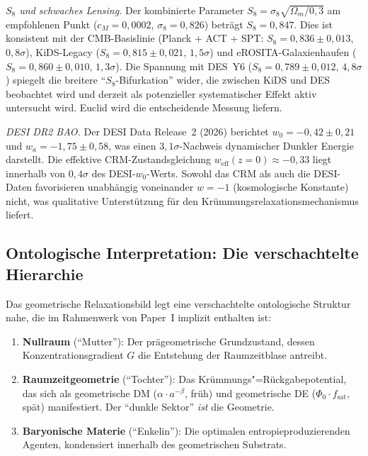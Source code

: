 \documentclass[aps,prd,twocolumn,superscriptaddress,nofootinbib,floatfix]{revtex4-2}
\begin{document}
\textit{$S_8$ und schwaches Lensing.} Der kombinierte Parameter $S_8 = \sigma_8\sqrt{\Omega_m/0{,}3}$ am empfohlenen Punkt ($c_M = 0{,}0002$, $\sigma_8 = 0{,}826$) beträgt $S_8 = 0{,}847$. Dies ist konsistent mit der CMB-Basislinie (Planck + ACT + SPT: $S_8 = 0{,}836 \pm 0{,}013$, $0{,}8\sigma$), KiDS-Legacy ($S_8 = 0{,}815 \pm 0{,}021$, $1{,}5\sigma$) und eROSITA-Galaxienhaufen ($S_8 = 0{,}860 \pm 0{,}010$, $1{,}3\sigma$). Die Spannung mit DES~Y6 ($S_8 = 0{,}789 \pm 0{,}012$, $4{,}8\sigma$) spiegelt die breitere "`$S_8$-Bifurkation"' wider, die zwischen KiDS und DES beobachtet wird und derzeit als potenzieller systematischer Effekt aktiv untersucht wird. Euclid wird die entscheidende Messung liefern.

\textit{DESI DR2 BAO.} Der DESI Data Release~2 (2026) berichtet $w_0 = -0{,}42 \pm 0{,}21$ und $w_a = -1{,}75 \pm 0{,}58$, was einen $3{,}1\sigma$-Nachweis dynamischer Dunkler Energie darstellt. Die effektive CRM-Zustandsgleichung $w_{\mathrm{eff}}(z=0) \approx -0{,}33$ liegt innerhalb von $0{,}4\sigma$ des DESI-$w_0$-Werts. Sowohl das CRM als auch die DESI-Daten favorisieren unabhängig voneinander $w = -1$ (kosmologische Konstante) nicht, was qualitative Unterstützung für den Krümmungsrelaxationsmechanismus liefert.

\subsection{Ontologische Interpretation: Die verschachtelte Hierarchie}
\label{subsec:nested}

Das geometrische Relaxationsbild legt eine verschachtelte ontologische Struktur nahe, die im Rahmenwerk von Paper~I \cite{Geiger2026} implizit enthalten ist:

\begin{enumerate}
\item \textbf{Nullraum} ("`Mutter"'): Der prägeometrische Grundzustand, dessen Konzentrationsgradient $G$ die Entstehung der Raumzeitblase antreibt.
\item \textbf{Raumzeitgeometrie} ("`Tochter"'): Das Krümmungs"=Rückgabepotential, das sich als geometrische DM ($\alpha \cdot a^{-\beta}$, früh) und geometrische DE ($\Phi_0 \cdot f_{\mathrm{sat}}$, spät) manifestiert. Der "`dunkle Sektor"' \textit{ist} die Geometrie.
\item \textbf{Baryonische Materie} ("`Enkelin"'): Die optimalen entropieproduzierenden Agenten, kondensiert innerhalb des geometrischen Substrats.
\end{enumerate}
\end{document}
